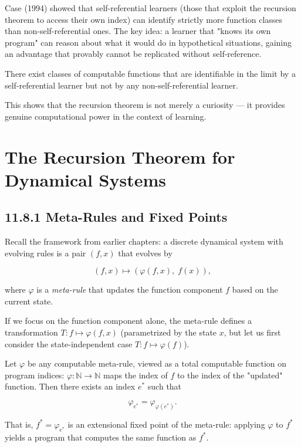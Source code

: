 Case (1994) showed that self-referential learners (those that exploit the recursion theorem to access their own index) can identify strictly more function classes than non-self-referential ones. The key idea: a learner that "knows its own program" can reason about what it would do in hypothetical situations, gaining an advantage that provably cannot be replicated without self-reference.

\begin{theorem}[Case 1994]
There exist classes of computable functions that are identifiable in the limit by a self-referential learner but not by any non-self-referential learner.

This shows that the recursion theorem is not merely a curiosity --- it provides genuine computational power in the context of learning.
\end{theorem}

\section{The Recursion Theorem for Dynamical Systems}

\subsection{11.8.1 Meta-Rules and Fixed Points}

Recall the framework from earlier chapters: a discrete dynamical system with evolving rules is a pair $(f, x)$ that evolves by

\[(f, x) \longmapsto (\varphi(f, x),\; f(x)),\]

where $\varphi$ is a \textit{meta-rule} that updates the function component $f$ based on the current state.

If we focus on the function component alone, the meta-rule defines a transformation $T: f \mapsto \varphi(f, x)$ (parametrized by the state $x$, but let us first consider the state-independent case $T: f \mapsto \varphi(f)$).

\begin{theorem}
Let $\varphi$ be any computable meta-rule, viewed as a total computable function on program indices: $\varphi: \mathbb{N} \to \mathbb{N}$ maps the index of $f$ to the index of the "updated" function. Then there exists an index $e^*$ such that

\[\varphi_{e^*} = \varphi_{\varphi(e^*)}.\]

That is, $f^* = \varphi_{e^*}$ is an extensional fixed point of the meta-rule: applying $\varphi$ to $f^*$ yields a program that computes the same function as $f^*$.


\end{theorem}

